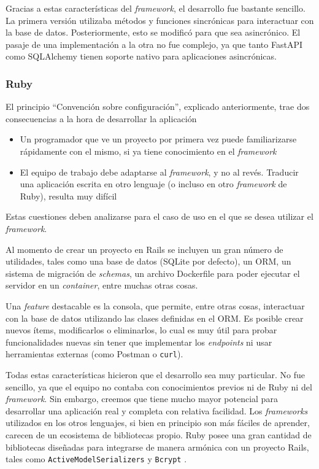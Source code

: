 \documentclass[11pt]{article}
\let\Oldsubsubsection\subsubsection
\renewcommand{\subsubsection}{\FloatBarrier\Oldsubsubsection}
\newcommand{\english}[1]{\textit{#1}}
\begin{document}
Gracias a estas características del \english{framework}, el desarrollo fue bastante sencillo. La primera versión utilizaba métodos y funciones sincrónicas para interactuar con la base de datos. Posteriormente, esto se modificó para que sea asincrónico. El pasaje de una implementación a la otra no fue complejo, ya que tanto FastAPI como SQLAlchemy tienen soporte nativo para aplicaciones asincrónicas.

\subsubsection{Ruby}

El principio ``Convención sobre configuración'', explicado anteriormente, trae dos consecuencias a la hora de desarrollar la aplicación
\begin{itemize}
    \item Un programador que ve un proyecto por primera vez puede familiarizarse rápidamente con el mismo, si ya tiene conocimiento en el \english{framework}
    \item El equipo de trabajo debe adaptarse al \english{framework}, y no al revés. Traducir una aplicación escrita en otro lenguaje (o incluso en otro \english{framework} de Ruby), resulta muy difícil
\end{itemize}
Estas cuestiones deben analizarse para el caso de uso en el que se desea utilizar el \english{framework}.

Al momento de crear un proyecto en Rails se incluyen un gran número de utilidades, tales como una base de datos (SQLite por defecto), un ORM, un sistema de migración de \english{schemas}, un archivo Dockerfile para poder ejecutar el servidor en un \english{container}, entre muchas otras cosas.

Una \english{feature} destacable es la consola, que permite, entre otras cosas, interactuar con la base de datos utilizando las clases definidas en el ORM. Es posible crear nuevos ítems, modificarlos o eliminarlos, lo cual es muy útil para probar funcionalidades nuevas sin tener que implementar los \english{endpoints} ni usar herramientas externas (como Postman o \lstinline{curl}).

Todas estas características hicieron que el desarrollo sea muy particular. No fue sencillo, ya que el equipo no contaba con conocimientos previos ni de Ruby ni del \english{framework}. Sin embargo, creemos que tiene mucho mayor potencial para desarrollar una aplicación real y completa con relativa facilidad. Los \english{frameworks} utilizados en los otros lenguajes, si bien en principio son más fáciles de aprender, carecen de un ecosistema de bibliotecas propio. Ruby posee una gran cantidad de bibliotecas diseñadas para integrarse de manera armónica con un proyecto Rails, tales como \lstinline{ActiveModelSerializers} \cite{http:ruby:active_model_serializer} y \lstinline{Bcrypt} \cite{http:ruby:bcrypt}.
\end{document}
